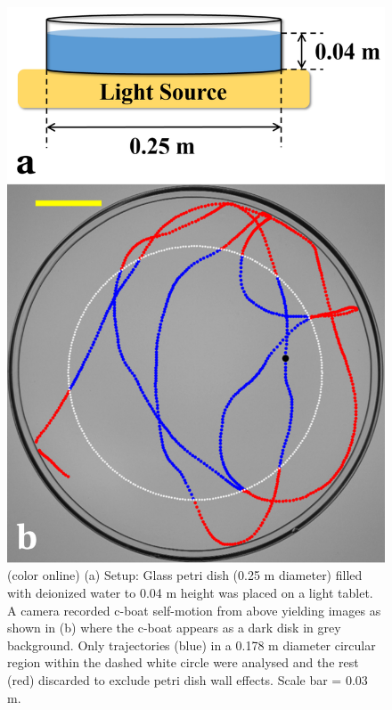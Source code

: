\documentclass[journal=langd5, manuscript=article, layout=twocolumn]{achemso}
\begin{document}
\begin{figure}[ht]
\centering
\includegraphics[width=0.9\linewidth]{figure1_v2.pdf}
\caption{(color online) (a) Setup: Glass petri dish (0.25 m diameter) filled with deionized water to 0.04 m height was placed on a light tablet. A camera recorded c-boat self-motion from above yielding images as shown in (b) where the c-boat appears as a dark disk in grey background. Only trajectories (blue) in a 0.178 m diameter circular region within the dashed white circle were analysed and the rest (red) discarded to exclude petri dish wall effects. Scale bar = 0.03 m.}
\label{fig1}
\end{figure}
\end{document}
